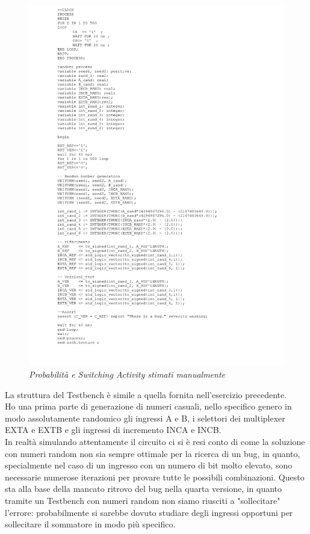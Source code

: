 \begin{figure}[!htb]
	\centering
	\includegraphics[scale=0.3]{immagini/testbench_vhdl2}
	\caption{\textit{Probabilità e Switching Activity stimati manualmente}}
	\label{testbench_vhdl2}
\end{figure}
\newpage
\noindent La struttura del Testbench è simile a quella fornita nell'esercizio precedente.\\
Ho una prima parte di generazione di numeri casuali, nello specifico genero in modo assolutamente randomico gli ingressi A e B, i selettori dei multiplexer EXTA e EXTB e gli ingressi di incremento INCA e INCB.\\
In realtà simulando attentamente il circuito ci si è resi conto di come la soluzione con numeri random non sia sempre ottimale per la ricerca di un bug, in quanto, specialmente nel caso di un ingresso con un numero di bit molto elevato, sono necessarie numerose iterazioni per provare tutte le possibili combinazioni. Questo sta alla base della mancato ritrovo del bug nella quarta versione, in quanto tramite un Testbench con numeri random non siamo riusciti a "sollecitare" l'errore: probabilmente si sarebbe dovuto studiare degli ingressi opportuni per sollecitare il sommatore in modo più specifico.\\
